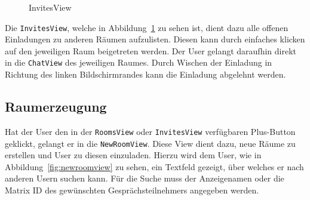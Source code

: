 \begin{figure}[h]
        \centering
        \caption{InvitesView}\label{fig:invitesview}
    \end{figure}
    Die \texttt{InvitesView}, welche in Abbildung~\ref{fig:invitesview} zu sehen ist, dient dazu alle offenen Einladungen zu anderen Räumen aufzulisten.
    Diesen kann durch einfaches klicken auf den jeweiligen Raum beigetreten werden.
    Der User gelangt daraufhin direkt in die \texttt{ChatView} des jeweiligen Raumes.
    Durch Wischen der Einladung in Richtung des linken Bildschirmrandes kann die Einladung abgelehnt werden.


    \newpage
    \subsection{Raumerzeugung}\label{subsec:raumerzeugung}
    Hat der User den in der \texttt{RoomsView} oder \texttt{InvitesView} verfügbaren Plus-Button geklickt, gelangt er in die \texttt{NewRoomView}.
    Diese View dient dazu, neue Räume zu erstellen und User zu diesen einzuladen.
    Hierzu wird dem User, wie in Abbildung~\ref{fig:newroomview} zu sehen, ein Textfeld gezeigt, über welches er nach anderen Usern suchen kann.
    Für die Suche muss der Anzeigenamen oder die Matrix ID des gewünschten Gesprächsteilnehmers angegeben werden.

